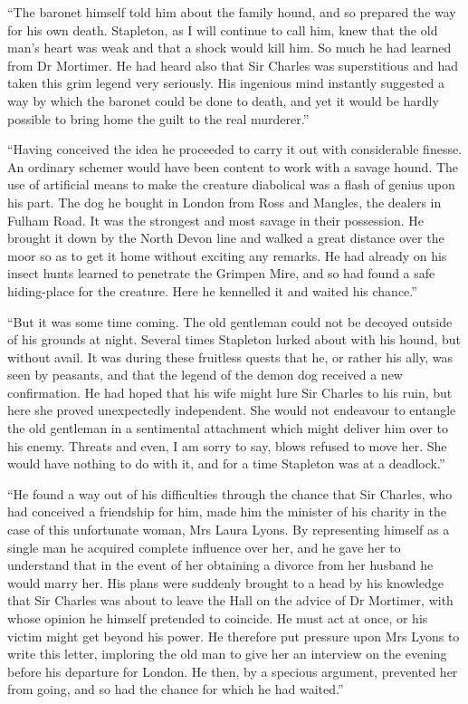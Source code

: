 \documentclass[paper=a5,BCOR=7mm,twoside,DIV=calc,12pt,usegeometry,openany,chapterprefix,endperiod,headings=big]{scrbook} %
\begin{document}
\enquote{The baronet himself told him about the family hound, and so prepared the way for his own death. Stapleton, as I will continue to call him, knew that the old man's heart was weak and that a shock would kill him. So much he had learned from Dr Mortimer. He had heard also that Sir Charles was superstitious and had taken this grim legend very seriously. His ingenious mind instantly suggested a way by which the baronet could be done to death, and yet it would be hardly possible to bring home the guilt to the real murderer.}

\enquote{Having conceived the idea he proceeded to carry it out with considerable finesse. An ordinary schemer would have been content to work with a savage hound. The use of artificial means to make the creature diabolical was a flash of genius upon his part. The dog he bought in London from Ross and Mangles, the dealers in Fulham Road. It was the strongest and most savage in their possession. He brought it down by the North Devon line and walked a great distance over the moor so as to get it home without exciting any remarks. He had already on his insect hunts learned to penetrate the Grimpen Mire, and so had found a safe hiding-place for the creature. Here he kennelled it and waited his chance.}

\enquote{But it was some time coming. The old gentleman could not be decoyed outside of his grounds at night. Several times Stapleton lurked about with his hound, but without avail. It was during these fruitless quests that he, or rather his ally, was seen by peasants, and that the legend of the demon dog received a new confirmation. He had hoped that his wife might lure Sir Charles to his ruin, but here she proved unexpectedly independent. She would not endeavour to entangle the old gentleman in a sentimental attachment which might deliver him over to his enemy. Threats and even, I am sorry to say, blows refused to move her. She would have nothing to do with it, and for a time Stapleton was at a deadlock.}

\enquote{He found a way out of his difficulties through the chance that Sir Charles, who had conceived a friendship for him, made him the minister of his charity in the case of this unfortunate woman, Mrs Laura Lyons. By representing himself as a single man he acquired complete influence over her, and he gave her to understand that in the event of her obtaining a divorce from her husband he would marry her. His plans were suddenly brought to a head by his knowledge that Sir Charles was about to leave the Hall on the advice of Dr Mortimer, with whose opinion he himself pretended to coincide. He must act at once, or his victim might get beyond his power. He therefore put pressure upon Mrs Lyons to write this letter, imploring the old man to give her an interview on the evening before his departure for London. He then, by a specious argument, prevented her from going, and so had the chance for which he had waited.}
\end{document}
